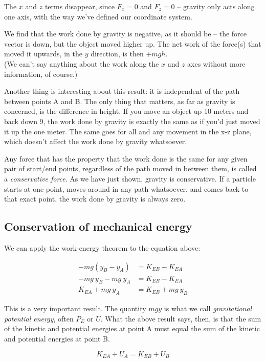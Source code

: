 The $x$ and $z$ terms disappear, since $F_x = 0$ and $F_z = 0$ -- gravity only acts along one axis, with the way we've defined our coordinate system.

We find that the work done by gravity is negative, as it should be -- the force vector is down, but the object moved higher up. The net work of the force(s) that moved it upwards, in the $y$ direction, is then $+ m g h$.\\
(We can't say anything about the work along the $x$ and $z$ axes without more information, of course.)

Another thing is interesting about this result: it is independent of the path between points A and B. The only thing that matters, as far as gravity is concerned, is the difference in height. If you move an object up 10 meters and back down 9, the work done by gravity is exactly the same as if you'd just moved it up the one meter. The same goes for all and any movement in the x-z plane, which doesn't affect the work done by gravity whatsoever.

Any force that has the property that the work done is the same for any given pair of start/end points, regardless of the path moved in between them, is called a \emph{conservative force}. As we have just shown, gravity is conservative. If a particle starts at one point, moves around in any path whatsoever, and comes back to that exact point, the work done by gravity is always zero.

\subsection{Conservation of mechanical energy}

We can apply the work-energy theorem to the equation above:

\begin{align}
-m g(y_B - y_A)& = K_{EB} - K_{EA}\\
-m g\ y_B - m g\ y_A &= K_{EB} - K_{EA}\\
K_{EA} + m g\ y_A &= K_{EB} + m g\ y_B
\end{align}

This is a very important result. The quantity $m g y$ is what we call \emph{gravitational potential energy}, often $P_E$ or $U$. What the above result says, then, is that the sum of the kinetic and potential energies at point A must equal the sum of the kinetic and potential energies at point B.

\begin{equation}
K_{EA} + U_A = K_{EB} + U_B
\end{equation}

